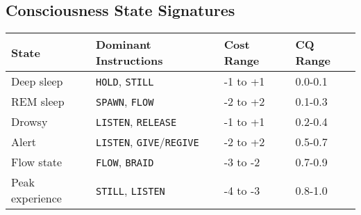 \documentclass[12pt,a4paper]{article}
\newcommand{\opcmd}[1]{\texttt{#1}}
\begin{document}
\subsection{Consciousness State Signatures}

\begin{table}[H]
\centering
\small
\begin{tabular}{llll}
\toprule
\textbf{State} & \textbf{Dominant Instructions} & \textbf{Cost Range} & \textbf{CQ Range} \\
\midrule
Deep sleep & \opcmd{HOLD}, \opcmd{STILL} & -1 to +1 & 0.0-0.1 \\
REM sleep & \opcmd{SPAWN}, \opcmd{FLOW} & -2 to +2 & 0.1-0.3 \\
Drowsy & \opcmd{LISTEN}, \opcmd{RELEASE} & -1 to +1 & 0.2-0.4 \\
Alert & \opcmd{LISTEN}, \opcmd{GIVE}/\opcmd{REGIVE} & -2 to +2 & 0.5-0.7 \\
Flow state & \opcmd{FLOW}, \opcmd{BRAID} & -3 to -2 & 0.7-0.9 \\
Peak experience & \opcmd{STILL}, \opcmd{LISTEN} & -4 to -3 & 0.8-1.0 \\
\bottomrule
\end{tabular}
\end{table}
\end{document}
